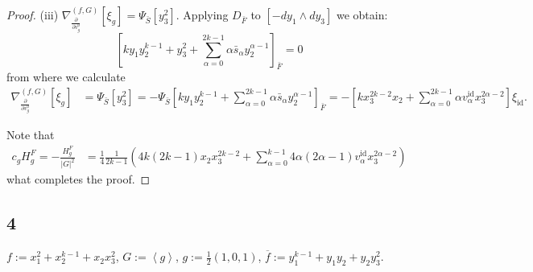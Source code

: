 \documentclass[reqno,12pt]{amsart}
\numberwithin{equation}{section}
\theoremstyle{plain}
\theoremstyle{definition}
\newcommand{\CC}{{\mathbb{C}}}
\newcommand{\Jac}{\mathrm{Jac}}
\newcommand{\id}{\mathrm{id}}
\def\T{{\mathcal T}}
\numberwithin{equation}{section}
\begin{document}
\begin{proof}
(iii) $\nabla_{\frac{\partial}{\partial v^0_{g}}}^{(f,G)}[\xi_{g}] = \Psi_{\bar{S}}[y_3^2]$. Applying $D_{\bar{F}}$ to $[-dy_1\wedge dy_3]$ we obtain:
\[
[ky_1y_2^{k-1} + y_3^2 + \sum_{\alpha = 0}^{2k-1} \alpha \bar{s}_{\alpha} y_2^{\alpha-1}]_{\bar{F}} = 0
\]
from where we calculate
\begin{align*}
    \nabla_{\frac{\partial}{\partial v^0_{g}}}^{(f,G)}[\xi_{g}] &= \Psi_{\bar{S}}[y_3^2] = - \Psi_{\bar{S}}[ky_1y_2^{k-1} + \sum_{\alpha = 0}^{2k-1} \alpha \bar{s}_{\alpha} y_2^{\alpha-1}] _{\bar{F}} = -[kx_3^{2k-2}x_2 + \sum_{\alpha=0}^{2k-1} \alpha v_{\alpha}^{\id} x_3^{2\alpha-2}]\xi_{\id} .
\end{align*}

Note that
\begin{align*}
    c_gH^F_g = -\frac{H^F_g}{|G|^2} &= \frac{1}{4} \frac{1}{2k-1} \left(4k(2k-1)x_2x_3^{2k-2} 
    +  \sum^{k-1}_{\alpha = 0} 4\alpha(2\alpha-1)v_{\alpha}^{\id} x_3^{2\alpha-2} \right)
\end{align*}
what completes the proof.
\end{proof}


\subsection*{4}
$f := x_1^{2} + x_2^{k-1} + x_2x_3^{2}$, $G:=\left<g\right>$, $g:=\frac{1}{2}(1,0,1)$, $\overline{f} := y_1^{k-1} + y_1y_2 + y_2y_3^2$.
% 
\end{document}

